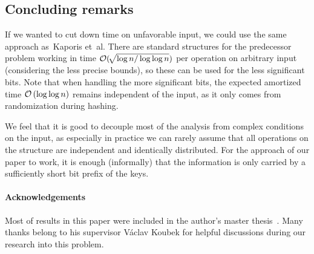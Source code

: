 \subsection{Concluding remarks}

If we wanted to cut down time on unfavorable input, we could use the
same approach as~Kaporis et~al. There are standard structures for
the predecessor problem working in time $\mathcal O(\!\sqrt{\log n/\log\log n})$
per operation on arbitrary input (considering the less precise bounds),
so these can be used for the less significant bits. Note that when
handling the more significant bits, the expected amortized time $\mathcal O\left(\log\log n\right)$
remains independent of the input, as it only comes from randomization
during hashing.

We feel that it is good to decouple most of the analysis from complex
conditions on the input, as especially in practice we can rarely assume
that all operations on the structure are independent and identically
distributed. For the approach of our paper to work, it is enough (informally)
that the information is only carried by a sufficiently short bit prefix
of the keys.

\paragraph{Acknowledgements}

Most of results in this paper were included in the author's master
thesis~\cite{Cunat10}. Many thanks belong to his supervisor Václav
Koubek for helpful discussions during our research into this problem.

